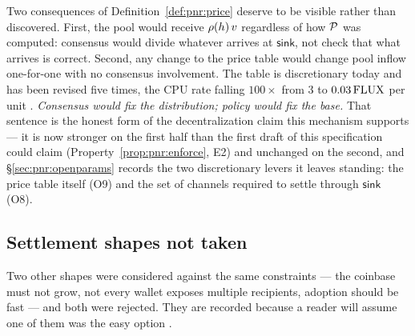 Two consequences of Definition~\ref{def:pnr:price} deserve to be visible rather than discovered.
First, the pool would receive $\rho(h)\,v$ regardless of how $\mathcal{P}$ was computed:
consensus would divide whatever arrives at $\mathsf{sink}$, not check that what arrives is correct.
Second, any change to the price table would change pool inflow one-for-one with no consensus
involvement. The table is discretionary today and has been revised five times, the CPU rate falling
$100\times$ from $3$ to $0.03\,\mathrm{FLUX}$ per unit \shipped
{}. \emph{Consensus would fix the
distribution; policy would fix the base.} That sentence is the honest form of the decentralization
claim this mechanism supports --- it is now stronger on the first half than the first draft of this
specification could claim (Property~\ref{prop:pnr:enforce}, E2) and unchanged on the second, and
\S\ref{sec:pnr:openparams} records the two discretionary levers it leaves standing: the price table
itself (O9) and the set of channels required to settle through $\mathsf{sink}$ (O8).

\subsection{Settlement shapes not taken}
\label{sec:pnr:alternatives}

Two other shapes were considered against the same constraints --- the coinbase must not grow, not
every wallet exposes multiple recipients, adoption should be fast --- and both were rejected. They
are recorded because a reader will assume one of them was the easy option
.

